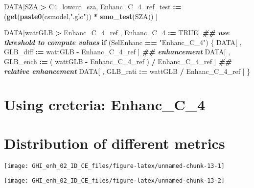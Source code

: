 \documentclass[
  10pt,
  a4paper,oneside]{article}
\newenvironment{Shaded}{\begin{snugshade}}{\end{snugshade}}
\newcommand{\ConstantTok}[1]{\textcolor[rgb]{0.56,0.35,0.01}{#1}}
\newcommand{\ControlFlowTok}[1]{\textcolor[rgb]{0.13,0.29,0.53}{\textbf{#1}}}
\newcommand{\DocumentationTok}[1]{\textcolor[rgb]{0.56,0.35,0.01}{\textbf{\textit{#1}}}}
\newcommand{\FunctionTok}[1]{\textcolor[rgb]{0.13,0.29,0.53}{\textbf{#1}}}
\newcommand{\NormalTok}[1]{#1}
\newcommand{\SpecialCharTok}[1]{\textcolor[rgb]{0.81,0.36,0.00}{\textbf{#1}}}
\newcommand{\StringTok}[1]{\textcolor[rgb]{0.31,0.60,0.02}{#1}}
\begin{document}
\begin{Shaded}
\begin{Highlighting}[]
\NormalTok{DATA[SZA }\SpecialCharTok{\textgreater{}}\NormalTok{ C4\_lowcut\_sza,}
\NormalTok{     Enhanc\_C\_4\_ref\_test }\SpecialCharTok{:=}\NormalTok{                                    (}\FunctionTok{get}\NormalTok{(}\FunctionTok{paste0}\NormalTok{(csmodel,}\StringTok{".glo"}\NormalTok{)) }\SpecialCharTok{*} \FunctionTok{smo\_test}\NormalTok{(SZA)) ]}



\NormalTok{DATA[wattGLB }\SpecialCharTok{\textgreater{}}\NormalTok{ Enhanc\_C\_4\_ref ,}
\NormalTok{     Enhanc\_C\_4 }\SpecialCharTok{:=} \ConstantTok{TRUE}\NormalTok{]}
\DocumentationTok{\#\# use threshold to compute values}
\ControlFlowTok{if}\NormalTok{ (SelEnhanc }\SpecialCharTok{==} \StringTok{"Enhanc\_C\_4"}\NormalTok{) \{}
\NormalTok{  DATA[ , GLB\_diff }\SpecialCharTok{:=}\NormalTok{   wattGLB }\SpecialCharTok{{-}}\NormalTok{ Enhanc\_C\_4\_ref                    ] }\DocumentationTok{\#\# enhancement}
\NormalTok{  DATA[ , GLB\_ench }\SpecialCharTok{:=}\NormalTok{ ( wattGLB }\SpecialCharTok{{-}}\NormalTok{ Enhanc\_C\_4\_ref ) }\SpecialCharTok{/}\NormalTok{ Enhanc\_C\_4\_ref ] }\DocumentationTok{\#\# relative enhancement}
\NormalTok{  DATA[ , GLB\_rati }\SpecialCharTok{:=}\NormalTok{   wattGLB }\SpecialCharTok{/}\NormalTok{ Enhanc\_C\_4\_ref                    ]}
\NormalTok{\}}
\end{Highlighting}
\end{Shaded}

\FloatBarrier

\hypertarget{using-creteria-enhanc_c_4}{%
\section{Using creteria: Enhanc\_C\_4}\label{using-creteria-enhanc_c_4}}

\hypertarget{distribution-of-different-metrics}{%
\section{Distribution of different metrics}\label{distribution-of-different-metrics}}

\begin{center}\texttt{[image: GHI\_enh\_02\_ID\_CE\_files/figure-latex/unnamed-chunk-13-1]} \end{center}

\begin{center}\texttt{[image: GHI\_enh\_02\_ID\_CE\_files/figure-latex/unnamed-chunk-13-2]} \end{center}
\end{document}
